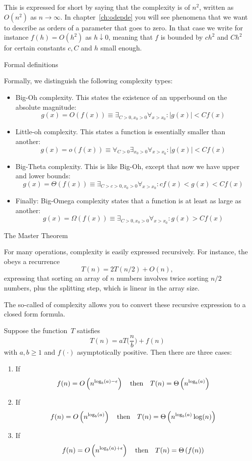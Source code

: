 This is
expressed for short by saying that the complexity is of
 $n^2$, written as~$O(n^2)$ as
$n\rightarrow\infty$. In
chapter~\ref{ch:odepde} you will see phenomena that we want to
describe as orders of a parameter that goes to zero. In that case we
write for instance $f(h)=O(h^2)$ as $h\downarrow0$, meaning that $f$
is bounded by $ch^2$ and $Ch^2$ for certain constants $c,C$ and $h$
small enough.

 {Formal definitions}

Formally, we distinguish the following complexity types:
\begin{itemize}
\item Big-Oh complexity. This states the existence of an upperbound
  on the absolute magnitude:
  \[ g(x) = O(f(x)) \equiv \exists_{C>0,x_0>0} \forall_{x>x_0} \colon |g(x)|<Cf(x) \]
\item Little-oh complexity. This states a function is essentially smaller than another:
  \[ g(x) = o(f(x)) \equiv \forall_{C>0} \exists_{x_0>0} \forall_{x>x_0} \colon |g(x)|<Cf(x) \]
\item Big-Theta complexity. This is like Big-Oh, except that now we have upper and lower bounds:
  \[ g(x) = \Theta(f(x)) \equiv \exists_{C>c>0,x_0>0} \forall_{x>x_0} \colon cf(x) < g(x) < Cf(x) \]
\item Finally: Big-Omega complexity states that a function is at least as large as another:
  \[ g(x) = \Omega(f(x)) \equiv \exists_{C>0,x_0>0} \forall_{x>x_0} \colon g(x) > Cf(x) \]
\end{itemize}

 {The Master Theorem}
\label{sec:compl-master}

For many operations, complexity is easily expressed recursively.
For instance, the 
obeys a recurrence
\[ T(n) = 2T(n/2) + O(n), \]
expressing that sorting an array of $n$ numbers involves twice sorting $n/2$ numbers,
plus the splitting step, which is linear in the array size.

The so-called  of complexity
allows you to convert these recursive expression to a closed form formula.

Suppose the function~$T$ satisfies
\[ T(n) = a T\bigl( \frac{n}{b} \bigr) + f(n) \]
with $a,b\geq 1$ and $f(\cdot)$ asymptotically positive.
Then there are three cases:
\begin{enumerate}
\item If
  \[ f(n)=O\left( n^{\log_b(a)-\epsilon} \right )
  \quad\hbox{then}\quad
  T(n) = \Theta \left( n^{\log_b(a)} \right )
  \]
\item If
  \[ f(n)=O\left( n^{\log_b(a)} \right )
  \quad\hbox{then}\quad
  T(n) = \Theta \left( n^{\log_b(a)}\log(n) \right )
  \]
\item If
  \[ f(n)=O\left( n^{\log_b(a)+\epsilon} \right )
  \quad\hbox{then}\quad
  T(n) = \Theta \left( f(n) \right )
  \]
\end{enumerate}


